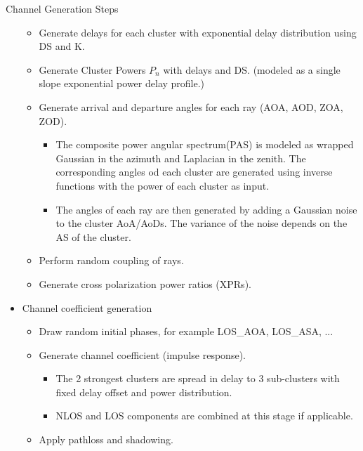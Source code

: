 \documentclass{beamer}
\begin{document}
\begin{frame}[allowframebreaks]{Channel Generation Steps}
\begin{itemize}
\begin{itemize}
    \item Generate delays for each cluster with exponential delay distribution using DS and K.
    \item Generate Cluster Powers $P_n$ with delays and DS. (modeled as a single slope exponential power delay profile.)
    \item Generate arrival and departure angles for each ray (AOA, AOD, ZOA, ZOD). 
    \begin{itemize}
        \item The composite power angular spectrum(PAS) is modeled as wrapped Gaussian in the azimuth and Laplacian in the zenith. The corresponding angles od each cluster are generated using inverse functions with the power of each cluster as input.
        \item The angles of each ray are then generated by adding a Gaussian noise to the cluster AoA/AoDs. The variance of the noise depends on the AS of the cluster.
    \end{itemize}  
    \item Perform random coupling of rays.
    \item Generate cross polarization power ratios (XPRs).
\end{itemize}
\framebreak
\item Channel coefficient generation
\begin{itemize}
    \item Draw random initial phases, for example LOS\_AOA, LOS\_ASA, ...
    \item Generate channel coefficient (impulse response).
    \begin{itemize}
        \item The 2 strongest clusters are spread in delay to 3 sub-clusters with fixed delay offset and power distribution.
        \item NLOS and LOS components are combined at this stage if applicable.
    \end{itemize}
    \item Apply pathloss and shadowing.
\end{itemize}

\end{itemize}
\end{frame}
\end{document}
